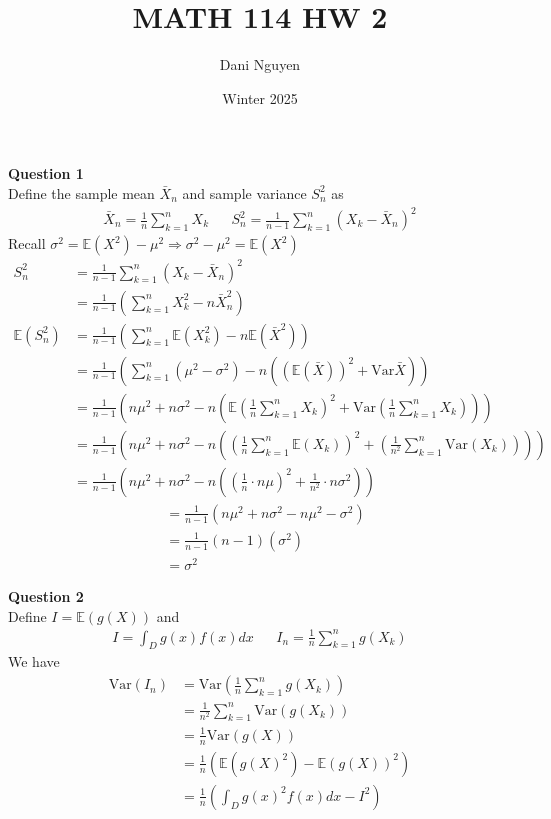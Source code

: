 \documentclass[12pt, letterpaper]{article}
\title{MATH 114 HW 2}
\author{Dani Nguyen}
\date{Winter 2025}
\begin{document}
\maketitle
\graphicspath{ {./} }

\noindent \textbf{Question 1} \\
Define the sample mean $\bar X_n$ and sample variance $S_n^2$ as 
\begin{align*}
    \bar X_n = \frac 1n \sum_{k=1}^{n}X_k & & S_n^2 = \frac{1}{n-1}\sum_{k=1}^{n}(X_k-\bar X_n)^2
\end{align*}
Recall $\sigma^2 = \mathbb{E}(X^2)-\mu^2 \Rightarrow \sigma^2 - \mu^2 = \mathbb{E}(X^2)$
\begin{align*}
    S_n^2 &= \frac{1}{n-1} \sum_{k=1}^{n}(X_k-\bar X_n)^2 \\
    &= \frac{1}{n-1} \left(\sum_{k=1}^{n} X_k^2 - n\bar X_n^2\right) \\
    \mathbb{E}(S_n^2 )&= \frac{1}{n-1} \left(\sum_{k=1}^{n} \mathbb{E}(X_k^2)-n\mathbb{E}(\bar X^2)\right) \\
    &= \frac{1}{n-1} \left(\sum_{k=1}^{n}(\mu^2 - \sigma^2) - n((\mathbb{E}(\bar X))^2 + \text{Var} \bar X) \right) \\
    &= \frac{1}{n-1} \left(n\mu^2 + n\sigma^2 - n (\mathbb{E}(\frac 1n \sum_{k=1}^{n}X_k)^2 + \text{Var}(\frac 1n \sum_{k=1}^n X_k)) \right)\\
    &= \frac{1}{n-1} \left(n\mu^2 + n\sigma^2 - n ((\frac 1n \sum_{k=1}^{n}\mathbb{E}(X_k))^2 + (\frac 1{n^2} \sum_{k=1}^n \text{Var}(X_k))) \right)\\
    &= \frac{1}{n-1} \left(n\mu^2 + n\sigma^2 - n ((\frac 1n\cdot n \mu)^2 + \frac 1{n^2}\cdot n\sigma^2) \right)
\end{align*}
\begin{align*}
    &= \frac{1}{n-1} \left(n\mu^2 + n\sigma^2 - n\mu^2 -\sigma^2 \right) \\
    &= \frac{1}{n-1} (n-1)(\sigma^2) \\
    &= \sigma^2
\end{align*}

\noindent \textbf{Question 2} \\
Define $I = \mathbb{E}(g(X))$ and 
\begin{align*}
    I = \int_{D} g(x)f(x)dx & & I_n = \frac 1n \sum_{k=1}^{n} g(X_k)
\end{align*}
We have
\begin{align*}
    \text{Var}(I_n) &= \text{Var}(\frac 1n \sum_{k=1}^{n}g(X_k)) \\
    &= \frac 1{n^2} \sum_{k=1}^{n}\text{Var}(g(X_k)) \\
    &= \frac 1n \text{Var}(g(X)) \\
    &= \frac 1n (\mathbb{E}(g(X)^2) - \mathbb{E}(g(X))^2) \\
    &= \frac 1n \left(\int_D g(x)^2f(x)dx - I^2\right)
\end{align*}
\end{document}
